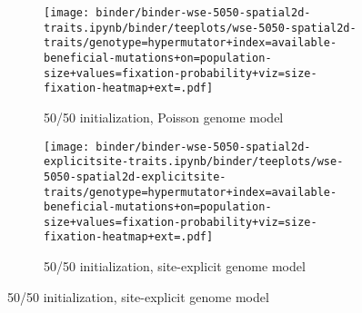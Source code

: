 \begin{figure}[h]
    \begin{subfigure}[b]{0.5\linewidth}
        \begin{minipage}{\linewidth}
          \texttt{[image: binder/binder-wse-5050-spatial2d-traits.ipynb/binder/teeplots/wse-5050-spatial2d-traits/genotype=hypermutator+index=available-beneficial-mutations+on=population-size+values=fixation-probability+viz=size-fixation-heatmap+ext=.pdf]}%
        \end{minipage}
        \begin{minipage}{\linewidth}
        \caption{50/50 initialization, Poisson genome model}
        \label{fig:fixheat-wse-256atile:5050}
        \end{minipage}%
    \end{subfigure}%
    \begin{subfigure}[b]{0.5\linewidth}
        \begin{minipage}{\linewidth}
          \texttt{[image: binder/binder-wse-5050-spatial2d-explicitsite-traits.ipynb/binder/teeplots/wse-5050-spatial2d-explicitsite-traits/genotype=hypermutator+index=available-beneficial-mutations+on=population-size+values=fixation-probability+viz=size-fixation-heatmap+ext=.pdf]}%
        \end{minipage}
        \begin{minipage}{\linewidth}
        \caption{50/50 initialization, site-explicit genome model}
        \label{fig:fixheat-wse-256atile:5050-explicitsite}
        \end{minipage}%
    \end{subfigure}


\end{figure}
